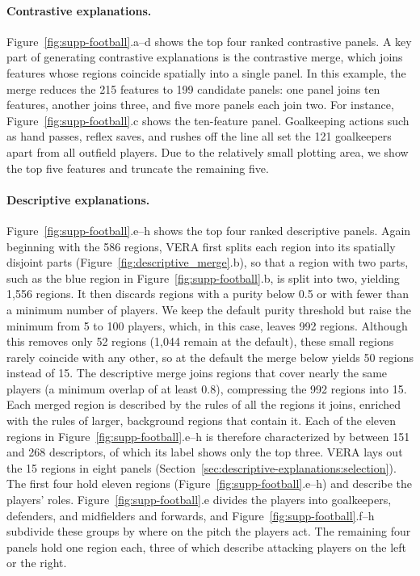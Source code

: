 \documentclass[10pt]{article}
\begin{document}
\paragraph{Contrastive explanations.}
Figure~\ref{fig:supp-football}.a--d shows the top four ranked contrastive panels.
A key part of generating contrastive explanations is the contrastive merge, which joins features whose regions coincide spatially into a single panel. In this example, the merge reduces the 215 features to 199 candidate panels: one panel joins ten features, another joins three, and five more panels each join two.
For instance, Figure~\ref{fig:supp-football}.c shows the ten-feature panel. Goalkeeping actions such as hand passes, reflex saves, and rushes off the line all set the 121 goalkeepers apart from all outfield players. Due to the relatively small plotting area, we show the top five features and truncate the remaining five.

\paragraph{Descriptive explanations.}
Figure~\ref{fig:supp-football}.e--h shows the top four ranked descriptive panels. 
Again beginning with the 586 regions, VERA first splits each region into its spatially disjoint parts (Figure~\ref{fig:descriptive_merge}.b), so that a region with two parts, such as the blue region in Figure~\ref{fig:supp-football}.b, is split into two, yielding 1,556 regions.
It then discards regions with a purity below 0.5 or with fewer than a minimum number of players. We keep the default purity threshold but raise the minimum from 5 to 100 players, which, in this case, leaves 992 regions. Although this removes only 52 regions (1,044 remain at the default), these small regions rarely coincide with any other, so at the default the merge below yields 50 regions instead of 15.
The descriptive merge joins regions that cover nearly the same players (a minimum overlap of at least 0.8), compressing the 992 regions into 15. Each merged region is described by the rules of all the regions it joins, enriched with the rules of larger, background regions that contain it. Each of the eleven regions in Figure~\ref{fig:supp-football}.e--h is therefore characterized by between 151 and 268 descriptors, of which its label shows only the top three.
VERA lays out the 15 regions in eight panels (Section~\ref{sec:descriptive-explanations:selection}).
The first four hold eleven regions (Figure~\ref{fig:supp-football}.e--h) and describe the players' roles. Figure~\ref{fig:supp-football}.e divides the players into goalkeepers, defenders, and midfielders and forwards, and Figure~\ref{fig:supp-football}.f--h subdivide these groups by where on the pitch the players act.
The remaining four panels hold one region each, three of which describe attacking players on the left or the right.
\end{document}
